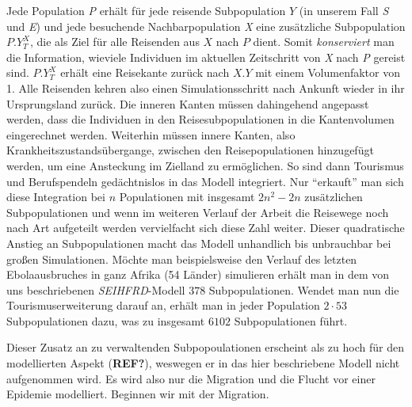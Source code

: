 Jede Population \emph{P} erhält für jede reisende Subpopulation $Y$ (in unserem Fall \emph{S} und \emph{E}) und jede besuchende Nachbarpopulation \emph{X} eine zusätzliche Subpopulation $P.Y^X_T$, die als Ziel für alle Reisenden aus $X$ nach $P$ dient. Somit \emph{konserviert} man die Information, wieviele Individuen im aktuellen Zeitschritt von \emph{X} nach \emph{P} gereist sind. $P.Y^X_T$ erhält eine Reisekante zurück nach $X.Y$ mit einem Volumenfaktor von 1. Alle Reisenden kehren also einen Simulationsschritt nach Ankunft wieder in ihr Ursprungsland zurück. Die inneren Kanten müssen dahingehend angepasst werden, dass die Individuen in den Reisesubpopulationen in die Kantenvolumen eingerechnet werden. Weiterhin müssen innere Kanten, also Krankheitszustandsübergange, zwischen den Reisepopulationen hinzugefügt werden, um eine Ansteckung im Zielland zu ermöglichen. So sind dann Tourismus und Berufspendeln gedächtnislos in das Modell integriert. Nur ``erkauft'' man sich diese Integration bei $n$ Populationen mit insgesamt $2n^2-2n$ zusätzlichen Subpopulationen und wenn im weiteren Verlauf der Arbeit die Reisewege noch nach Art aufgeteilt werden vervielfacht sich diese Zahl weiter. Dieser quadratische Anstieg an Subpopulationen macht das Modell unhandlich bis unbrauchbar bei großen Simulationen. Möchte man beispielsweise den Verlauf des letzten Ebolaausbruches in ganz Afrika (54 Länder) simulieren erhält man in dem von uns beschriebenen \emph{SEIHFRD}-Modell $378$ Subpopulationen. Wendet man nun die Tourismuserweiterung darauf an, erhält man in jeder Population $2\cdot 53$ Subpopulationen dazu, was zu insgesamt $6102$ Subpopulationen führt. 

Dieser Zusatz an zu verwaltenden Subpopoulationen erscheint als zu hoch für den modellierten Aspekt (\textbf{REF?}), weswegen er in das hier beschriebene Modell nicht aufgenommen wird. Es wird also nur die Migration und die Flucht vor einer Epidemie modelliert. Beginnen wir mit der Migration. 

